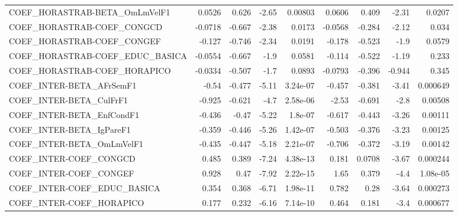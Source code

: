 \begin{tabular}{lrrrrrrrr}
COEF\_HORASTRAB-BETA\_OmLmVelF1         &      0.0526 &        0.626 &   -2.65 &  0.00803 &     0.0606 &       0.409 &        -2.31 &        0.0207 \\
COEF\_HORASTRAB-COEF\_CONGCD            &     -0.0718 &       -0.667 &   -2.38 &   0.0173 &    -0.0568 &      -0.284 &        -2.12 &         0.034 \\
COEF\_HORASTRAB-COEF\_CONGEF            &      -0.127 &       -0.746 &   -2.34 &   0.0191 &     -0.178 &      -0.523 &         -1.9 &        0.0579 \\
COEF\_HORASTRAB-COEF\_EDUC\_BASICA       &     -0.0554 &       -0.667 &    -1.9 &   0.0581 &     -0.114 &      -0.522 &        -1.19 &         0.233 \\
COEF\_HORASTRAB-COEF\_HORAPICO          &     -0.0334 &       -0.507 &    -1.7 &   0.0893 &    -0.0793 &      -0.396 &       -0.944 &         0.345 \\
COEF\_INTER-BETA\_AFrSemF1              &       -0.54 &       -0.477 &   -5.11 & 3.24e-07 &     -0.457 &      -0.381 &        -3.41 &      0.000649 \\
COEF\_INTER-BETA\_CulFrF1               &      -0.925 &       -0.621 &    -4.7 & 2.58e-06 &      -2.53 &      -0.691 &         -2.8 &       0.00508 \\
COEF\_INTER-BETA\_EnfCondF1             &      -0.436 &        -0.47 &   -5.22 &  1.8e-07 &     -0.617 &      -0.443 &        -3.26 &       0.00111 \\
COEF\_INTER-BETA\_IgPareF1              &      -0.359 &       -0.446 &   -5.26 & 1.42e-07 &     -0.503 &      -0.376 &        -3.23 &       0.00125 \\
COEF\_INTER-BETA\_OmLmVelF1             &      -0.435 &       -0.447 &   -5.18 & 2.21e-07 &     -0.706 &      -0.372 &        -3.19 &       0.00142 \\
COEF\_INTER-COEF\_CONGCD                &       0.485 &        0.389 &   -7.24 & 4.38e-13 &      0.181 &      0.0708 &        -3.67 &      0.000244 \\
COEF\_INTER-COEF\_CONGEF                &       0.928 &         0.47 &   -7.92 & 2.22e-15 &       1.65 &       0.379 &         -4.4 &      1.08e-05 \\
COEF\_INTER-COEF\_EDUC\_BASICA           &       0.354 &        0.368 &   -6.71 & 1.98e-11 &      0.782 &        0.28 &        -3.64 &      0.000273 \\
COEF\_INTER-COEF\_HORAPICO              &       0.177 &        0.232 &   -6.16 & 7.14e-10 &      0.464 &       0.181 &         -3.4 &      0.000677 \\

\end{tabular}
